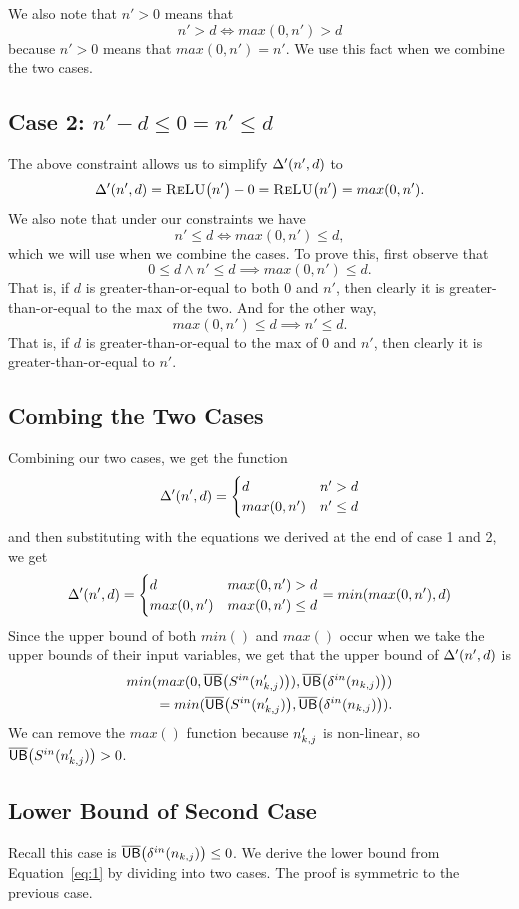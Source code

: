 We also note that $ n' > 0 $ means that
\[
n' > d \iff max(0, n') > d
\]
because $ n' > 0 $ means that $ max(0, n') = n' $. We use this fact when we combine the two cases.

\subsection*{Case 2: $ n' - d \leq 0 = n' \leq d $}
The above constraint allows us to simplify $ \Delta'(n',d) $ to
\[
	\Delta'(n',d) = \textsc{ReLU}\big(n'\big) - 0 = \textsc{ReLU}\big(n'\big) = max(0, n').
\]
We also note that under our constraints we have
\[
n' \leq d \iff max(0, n') \leq d,
\]
which we will use when we combine the cases. To prove this, first observe that
\[
0 \leq d \wedge n' \leq d \implies max(0, n') \leq d.
\]
That is, if $ d $ is greater-than-or-equal to both 0 and $ n' $, then clearly
it is greater-than-or-equal to the max of the two. And for the other way,
\[
max(0, n') \leq d \implies  n' \leq d.
\]
That is, if $ d $ is greater-than-or-equal to the max of 0 and $ n' $, then clearly
it is greater-than-or-equal to $ n' $.

\subsection*{Combing the Two Cases}
Combining our two cases, we get the function
\[
	\Delta'(n',d) = \begin{cases}
	d & n' > d\\
	max(0, n') & n' \leq d
	\end{cases}
\]
and then substituting with the equations we derived at the end of case 1 and 2, we get
\[
\Delta'(n',d) = \begin{cases}
d & max(0, n') > d\\
max(0, n') & max(0, n') \leq d
\end{cases} = min(max(0, n'), d)
\]
Since the upper bound of both $ min() $ and $ max() $ occur when we take the upper bounds of their input variables, we get that the upper bound of $ \Delta'(n',d) $ is
\begin{align*}
min(max(0, \overline{\mathsf{UB}}\big(S^{in}(n'_{k,j})\big)), \overline{\mathsf{UB}}\big(\delta^{in}(n_{k,j})\big))\\
= min(\overline{\mathsf{UB}}\big(S^{in}(n'_{k,j})\big), \overline{\mathsf{UB}}\big(\delta^{in}(n_{k,j})\big)).
\end{align*}
We can remove the $ max() $ function because $ n'_{k,j} $ is non-linear, so
$ \overline{\mathsf{UB}}\big(S^{in}(n'_{k,j})\big) > 0 $.


\subsection{Lower Bound of Second Case}
Recall this case is $ \overline{\mathsf{UB}}\big(\delta^{in}(n_{k,j})\big) \leq 0 $. We derive the lower bound from Equation~\ref{eq:1} by dividing into two cases. The proof is symmetric to the previous case.
